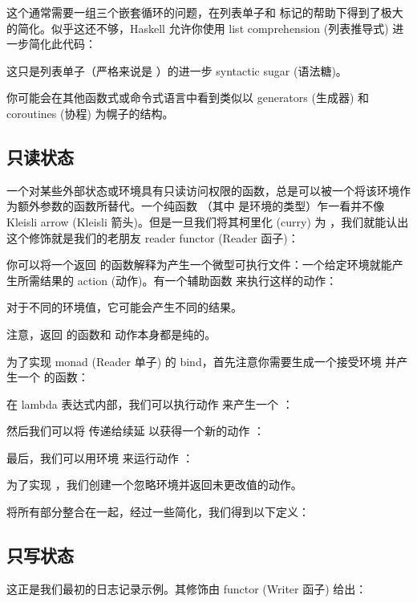 这个通常需要一组三个嵌套循环的问题，在列表单子和  标记的帮助下得到了极大的简化。似乎这还不够，Haskell 允许你使用 list comprehension (列表推导式) 进一步简化此代码：

这只是列表单子（严格来说是 ）的进一步 syntactic sugar (语法糖)。

你可能会在其他函数式或命令式语言中看到类似以 generators (生成器) 和 coroutines (协程) 为幌子的结构。

\subsection{只读状态}

一个对某些外部状态或环境具有只读访问权限的函数，总是可以被一个将该环境作为额外参数的函数所替代。一个纯函数 （其中  是环境的类型）乍一看并不像 Kleisli arrow (Kleisli 箭头)。但是一旦我们将其柯里化 (curry) 为 ，我们就能认出这个修饰就是我们的老朋友 reader functor (Reader 函子)：

你可以将一个返回  的函数解释为产生一个微型可执行文件：一个给定环境就能产生所需结果的 action (动作)。有一个辅助函数  来执行这样的动作：

对于不同的环境值，它可能会产生不同的结果。

注意，返回  的函数和  动作本身都是纯的。

为了实现  monad (Reader 单子) 的 bind，首先注意你需要生成一个接受环境  并产生一个  的函数：

在 lambda 表达式内部，我们可以执行动作  来产生一个 ：

然后我们可以将  传递给续延  以获得一个新的动作 ：

最后，我们可以用环境  来运行动作 ：

为了实现 ，我们创建一个忽略环境并返回未更改值的动作。

将所有部分整合在一起，经过一些简化，我们得到以下定义：


\subsection{只写状态}

这正是我们最初的日志记录示例。其修饰由  functor (Writer 函子) 给出：

